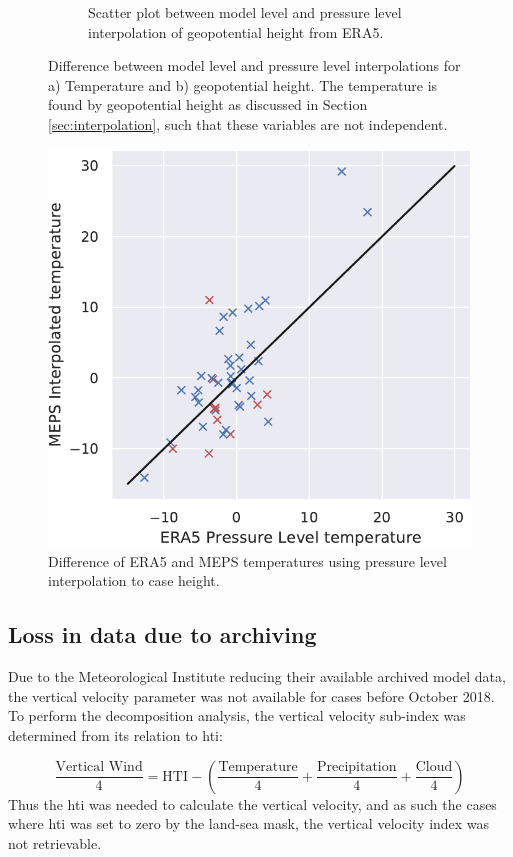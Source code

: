 \begin{figure}
\begin{subfigure}[h]{0.45\textwidth}
    \caption{Scatter plot between model level and pressure level interpolation of geopotential height from ERA5.}
    \label{fig:mlvsplgeopot}
    \end{subfigure}
    \caption{Difference between model level and pressure level interpolations for a) Temperature and b) geopotential height. The temperature is found by geopotential height as discussed in Section \ref{sec:interpolation}, such that these variables are not independent.}
    \label{fig:mlvspl}
\end{figure}

\begin{figure}
    \centering
    \includegraphics[width=.5\textwidth]{Figures/T750MEPSera5diff.pdf}
    \caption{Difference of ERA5 and MEPS temperatures using pressure level interpolation to case height.}
    \label{fig:eramepsdiff}
\end{figure}

\subsection{Loss in data due to archiving}
Due to the Meteorological Institute reducing their available archived model data, the vertical velocity parameter was not available for cases before October 2018. To perform the decomposition analysis, the vertical velocity sub-index was determined from its relation to \acrshort{hti}:

\[\frac{\text{Vertical Wind}}{4} = \text{HTI} - (\frac{\text{Temperature}}{4} + \frac{\text{Precipitation}}{4} +\frac{\text{Cloud}}{4}) \] 
Thus the \acrshort{hti} was needed to calculate the vertical velocity, and as such the cases where \acrshort{hti} was set to zero by the land-sea mask, the vertical velocity index was not retrievable. 